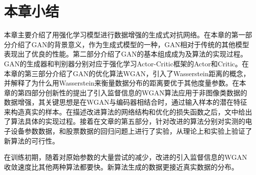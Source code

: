 \section{本章小结}

本章主要介绍了用强化学习模型进行数据增强的生成式对抗网络。在本章的第一部分介绍了GAN的背景意义，作为生成式模型的一种，GAN相对于传统的其他模型表现出了优良的性能。第二部分介绍了GAN的基本组成成为及算法的实现过程。GAN的生成器和判别器分别对应于强化学习Actor-Critic框架的Actor和Critic。在本章的第三部分介绍了GAN的优化算法WGAN，引入了Wasserstein距离的概念，并解释了为什么用Wasserstein来衡量数据分布的距离要优于其他度量参数。在本章的第四部分创新性的提出了引入监督信息的WGAN算法应用于非图像类数据的数据增强，其关键思想是在WGAN与编码器相结合时，通过输入样本的潜在特征来构造真实的样本。在描述改进算法的网络结构和优化的损失函数之后，文中给出了算法具体的实现过程。接着在文章的第五部分，针对改进的算法分别对实测的电子设备参数数据，和股票数据的回归问题上进行了实验，从理论上和实验上验证了新算法的可行性。

在训练初期，随着对原始参数的大量尝试的减少，改进的引入监督信息的WGAN收敛速度比其他两种算法都要快。新算法生成的数据更接近真实数据的分布。